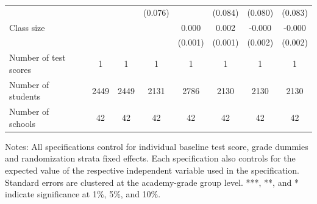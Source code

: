 \begin{center}
\begin{scriptsize}
\begin{threeparttable}
\begin{tabular} {@{} l l c c c c c c c  @{}}
                 &  &  &  & (0.076) &  & (0.084) & (0.080) & (0.083) \\
Class size &  &  &  &  & 0.000 & 0.002 & -0.000 & -0.000 \\
                 &  &  &  &  & (0.001) & (0.001) & (0.002) & (0.002) \\
\midrule
Number of test scores &  & 1 & 1 & 1 & 1 & 1 & 1 & 1 \\
Number of students &  & 2449 & 2449 & 2131 & 2786 & 2130 & 2130 & 2130 \\
Number of schools &  & 42 & 42 & 42 & 42 & 42 & 42 & 42 \\
\bottomrule
\end{tabular}
\begin{tablenotes}
\item Notes: All specifications control for individual baseline test score, grade dummies and randomization strata fixed effects. Each specification also controls for the expected value of the respective independent variable used in the specification. Standard errors are clustered at the academy-grade group level. ***, **, and * indicate significance at 1\%, 5\%, and 10\%.\end{tablenotes}
\end{threeparttable}
\end{scriptsize}
\end{center}
\clearpage
